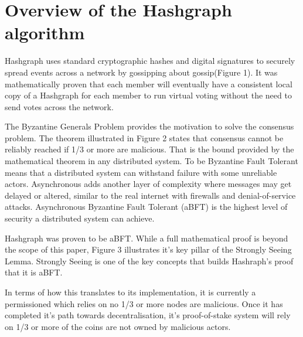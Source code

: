 \section{Overview of the Hashgraph algorithm}



Hashgraph uses standard cryptographic hashes and digital signatures to securely spread events across a network by gossipping about gossip(Figure 1).%
It was mathematically proven that each member will eventually have a consistent local copy of a Hashgraph for each member to run virtual voting without the need to send votes across the network\cite{baird2016}.


The Byzantine Generals Problem\cite{shostak1982byzantine} provides the motivation to solve the consensus problem. The theorem illustrated in Figure 2 states that consensus cannot be reliably reached if 1/3 or more are malicious. That is the bound provided by the mathematical theorem in any distributed system. To be Byzantine Fault Tolerant means that a distributed system can withstand failure with some unreliable actors. Asynchronous adds another layer of complexity where messages may get delayed or altered, similar to the real internet with firewalls and denial-of-service attacks. Asynchronous Byzantine Fault Tolerant (aBFT) is the highest level of security a distributed system can achieve\cite{coq2018}.


Hashgraph was proven to be aBFT\cite{baird2016}. While a full mathematical proof is beyond the scope of this paper, Figure 3 illustrates it's key pillar of the Strongly Seeing Lemma. Strongly Seeing is one of the key concepts that builds Hashraph's proof that it is aBFT.

In terms of how this translates to its implementation, it is currently a permissioned which relies on no 1/3 or more nodes are malicious. Once it has completed it's path towards decentralisation, it's proof-of-stake system will rely on 1/3 or more of the coins are not owned by malicious actors. 

% 



